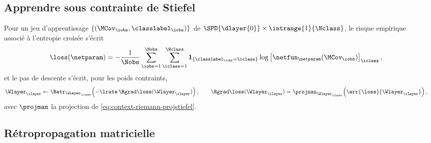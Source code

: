 \subsection{Apprendre sous contrainte de Stiefel}
\label{sec:spdnet-apprentissage}


Pour un jeu d'apprentissage $\{(\MCov_\iobs,\classlabel_\iobs)\}$ de
$\SPD{\dlayer{0}}\times\intrange{1}{\Nclass}$, le risque empirique associé à
l'entropie croisée s'écrit
\begin{equation}
  \loss(\netparam)
  =
  -\frac{1}{\Nobs}\sum_{\iobs=1}^{\Nobs}\sum_{\iclass=1}^{\Nclass}
  \mathbf{1}_{\{\classlabel_\iobs=\iclass\}}
  \log\left[\netfun_{\netparam}(\MCov_\iobs)\right]_\iclass,
  \label{eq:spdnet-risque}
\end{equation}
et le pas de descente s'écrit, pour les poids contraints,
\begin{equation}
  \Wlayer_\ilayer
  \gets
  \Retr_{\Wlayer_\ilayer}\!\left(-\lrate\,\Rgrad\loss(\Wlayer_\ilayer)\right),
  \qquad
  \Rgrad\loss(\Wlayer_\ilayer)
  =
  \projman_{\Wlayer_\ilayer}\!\left(\err{\loss}{\Wlayer_\ilayer}\right),
  \label{eq:spdnet-descente}
\end{equation}
avec $\projman$ la projection de \cref{eq:context-riemann-projstiefel}.

\subsection{Rétropropagation matricielle}
\label{sec:spdnet-backprop}

